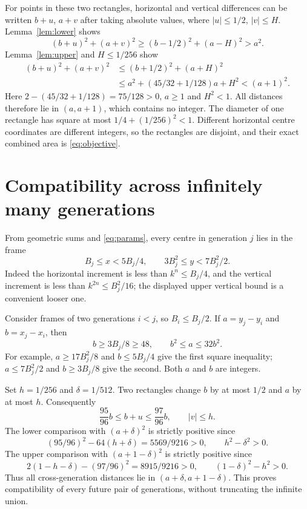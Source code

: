 \documentclass[11pt,a4paper]{article}
\theoremstyle{remark}\newtheorem{remark}[theorem]{Remark}
\begin{document}
For points in these two rectangles, horizontal and vertical differences can
be written $b+u$, $a+v$ after taking absolute values, where $|u|\le1/2$,
$|v|\le H$. Lemma~\ref{lem:lower} shows
\[
 (b+u)^2+(a+v)^2\ge(b-1/2)^2+(a-H)^2>a^2.
\]
Lemma~\ref{lem:upper} and $H\le1/256$ show
\begin{align*}
 (b+u)^2+(a+v)^2
 &\le(b+1/2)^2+(a+H)^2\\
 &\le a^2+(45/32+1/128)a+H^2<(a+1)^2.
\end{align*}
Here $2-(45/32+1/128)=75/128>0$, $a\ge1$ and $H^2<1$.
All distances therefore lie in $(a,a+1)$, which contains no integer.
The diameter of one rectangle has square at most $1/4+(1/256)^2<1$.
Different horizontal centre coordinates are different integers, so the
rectangles are disjoint, and their exact combined area is \eqref{eq:objective}.

\section{Compatibility across infinitely many generations}
From geometric sums and \eqref{eq:params}, every centre in generation $j$ lies
in the frame
\begin{equation}\label{eq:frame}
 B_j\le x<5B_j/4,\qquad 3B_j^2\le y<7B_j^2/2.
\end{equation}
Indeed the horizontal increment is less than $k^n\le B_j/4$, and the vertical
increment is less than $k^{2n}\le B_j^2/16$; the displayed upper vertical
bound is a convenient looser one.

Consider frames of two generations $i<j$, so $B_i\le B_j/2$. If $a=y_j-y_i$
and $b=x_j-x_i$, then
\[
 b\ge3B_j/8\ge48,\qquad b^2\le a\le32b^2.
\]
For example, $a\ge17B_j^2/8$ and $b\le5B_j/4$ give the first square inequality;
$a\le7B_j^2/2$ and $b\ge3B_j/8$ give the second. Both $a$ and $b$ are integers.

Set $h=1/256$ and $\delta=1/512$. Two rectangles change $b$ by at most $1/2$
and $a$ by at most $h$. Consequently
\[
 \frac{95}{96}b\le b+u\le\frac{97}{96}b,\qquad |v|\le h.
\]
The lower comparison with $(a+\delta)^2$ is strictly positive since
\[
 (95/96)^2-64(h+\delta)=5569/9216>0,
 \qquad h^2-\delta^2>0.
\]
The upper comparison with $(a+1-\delta)^2$ is strictly positive since
\[
 2(1-h-\delta)-(97/96)^2=8915/9216>0,
 \qquad (1-\delta)^2-h^2>0.
\]
Thus all cross-generation distances lie in $(a+\delta,a+1-\delta)$.
This proves compatibility of every future pair of generations, without
truncating the infinite union.
\end{document}
